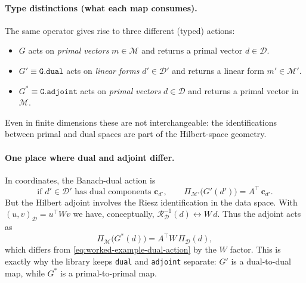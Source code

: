 \documentclass[11pt,twoside,openright]{book}
\theoremstyle{plain}
\theoremstyle{definition}
\theoremstyle{remark}
\newcommand{\modelspace}{\mathcal{M}}
\newcommand{\dataspace}{\mathcal{D}}
\newcommand{\ipD}[2]{(#1,#2)_{\dataspace}}
\newcommand{\Riesz}{\mathcal{R}}
\begin{document}
\paragraph{Type distinctions (what each map consumes).}
The same operator gives rise to three different (typed) actions:
\begin{itemize}
  \item $G$ acts on \emph{primal vectors} $m\in\modelspace$ and returns a primal
    vector $d\in\dataspace$.
  \item $G'\equiv\texttt{G.dual}$ acts on \emph{linear forms} $d'\in\dataspace'$
    and returns a linear form $m'\in\modelspace'$.
  \item $G^*\equiv\texttt{G.adjoint}$ acts on \emph{primal vectors} $d\in\dataspace$
    and returns a primal vector in $\modelspace$.
\end{itemize}
Even in finite dimensions these are not interchangeable: the identifications
between primal and dual spaces are part of the Hilbert-space geometry.

\paragraph{One place where dual and adjoint differ.}
In coordinates, the Banach-dual action is
\begin{equation}
  \label{eq:worked-example-dual-action}
  \text{if } d'\in\dataspace' \text{ has dual components } \mathbf{c}_{d'},
  \qquad
  \Pi_{\modelspace'}\bigl(G'(d')\bigr) = A^\top\,\mathbf{c}_{d'}.
\end{equation}
But the Hilbert adjoint involves the Riesz identification in the data space.
With $\ipD{u}{v}=u^\top W v$ we have, conceptually,
\(\Riesz_{\dataspace}^{-1}(d)\leftrightarrow W\,d\).
Thus the adjoint acts as
\begin{equation}
  \label{eq:worked-example-adjoint-action}
  \Pi_{\modelspace}\bigl(G^*(d)\bigr) = A^\top W\,\Pi_{\dataspace}(d),
\end{equation}
which differs from \eqref{eq:worked-example-dual-action} by the $W$ factor.
This is exactly why the library keeps \texttt{dual} and \texttt{adjoint}
separate: $G'$ is a dual-to-dual map, while $G^*$ is a primal-to-primal map.
\end{document}
